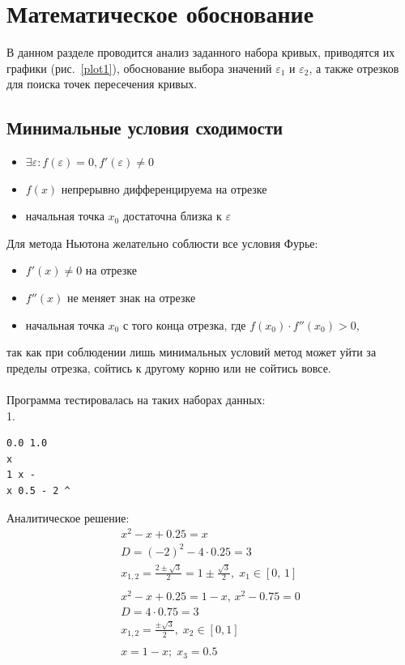 \documentclass[a4paper,12pt,titlepage,finall]{article}
\begin{document}
\newpage

\section{Математическое обоснование}

В данном разделе проводится анализ заданного набора кривых, приводятся их графики (рис.~\ref{plot1}),
обоснование выбора значений $\varepsilon_1$ и $\varepsilon_2$, а также отрезков для поиска точек
пересечения кривых.

\subsection{Минимальные условия сходимости}
\begin{itemize}
    \item $\exists \varepsilon: f(\varepsilon) = 0, f'(\varepsilon) \neq 0$
    \item $f(x)$ непрерывно дифференцируема на отрезке
    \item начальная точка $x_0$ достаточна близка к $\varepsilon$
\end{itemize}

Для метода Ньютона желательно соблюсти все условия Фурье:
\begin{itemize}
    \item $f'(x) \neq 0$ на отрезке
    \item $f''(x)$ не меняет знак на отрезке
    \item начальная точка $x_0$ с того конца отрезка, где $f(x_0)\cdot f''(x_0) > 0$,
\end{itemize}
так как при соблюдении лишь минимальных условий метод может уйти за пределы отрезка, сойтись к другому корню или не сойтись вовсе.~\cite{math}\\\\

Программа тестировалась на таких наборах данных:\\
1.
\begin{verbatim}
0.0 1.0
x
1 x -
x 0.5 - 2 ^
\end{verbatim}
Аналитическое решение:
$$
\begin{gathered}
    x^2 - x + 0.25 = x\\D = (-2)^2-4\cdot0.25=3\\x_{1,2}=\frac{2\pm \sqrt{3}}{2}=1 \pm \frac{\sqrt{3}}{2},\; x_1 \in [0,\,1]\\\\
    x^2 - x + 0.25 = 1-x,\,x^2-0.75=0\\D = 4\cdot0.75=3\\x_{1,2}=\frac{\pm \sqrt{3}}{2},\;x_2 \in [0, 1]\\\\
x = 1-x;\; x_3=0.5
\end{gathered}
$$
\end{document}
